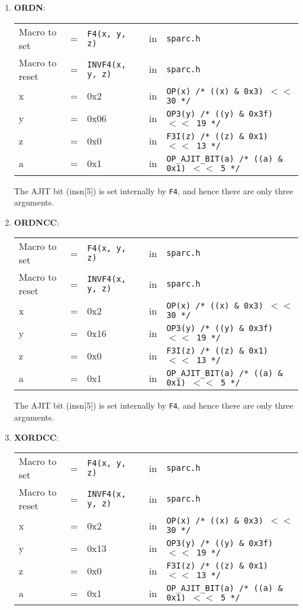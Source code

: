 \begin{itemize}
\begin{enumerate}
  \item \textbf{ORDN}:\\
    \begin{tabular}[h]{lclcl}
      Macro to set  &=& \texttt{F4(x, y, z)} &in& \texttt{sparc.h}     \\
      Macro to reset  &=& \texttt{INVF4(x, y, z)} &in& \texttt{sparc.h}     \\
      x &=& 0x2      &in& \texttt{OP(x)  /* ((x) \& 0x3)  $<<$ 30 */} \\
      y &=& 0x06     &in& \texttt{OP3(y) /* ((y) \& 0x3f) $<<$ 19 */} \\
      z &=& 0x0      &in& \texttt{F3I(z) /* ((z) \& 0x1)  $<<$ 13 */} \\
      a &=& 0x1      &in& \texttt{OP\_AJIT\_BIT(a) /* ((a) \& 0x1)  $<<$ 5 */}
    \end{tabular}

    The AJIT bit  (insn[5]) is set internally by  \texttt{F4}, and hence
    there are only three arguments.

  \item \textbf{ORDNCC}:\\
    \begin{tabular}[h]{lclcl}
      Macro to set  &=& \texttt{F4(x, y, z)} &in& \texttt{sparc.h}     \\
      Macro to reset  &=& \texttt{INVF4(x, y, z)} &in& \texttt{sparc.h}     \\
      x &=& 0x2      &in& \texttt{OP(x)  /* ((x) \& 0x3)  $<<$ 30 */} \\
      y &=& 0x16     &in& \texttt{OP3(y) /* ((y) \& 0x3f) $<<$ 19 */} \\
      z &=& 0x0      &in& \texttt{F3I(z) /* ((z) \& 0x1)  $<<$ 13 */} \\
      a &=& 0x1      &in& \texttt{OP\_AJIT\_BIT(a) /* ((a) \& 0x1)  $<<$ 5 */}
    \end{tabular}

    The AJIT bit  (insn[5]) is set internally by  \texttt{F4}, and hence
    there are only three arguments.

  \item \textbf{XORDCC}:\\
    \begin{tabular}[h]{lclcl}
      Macro to set  &=& \texttt{F4(x, y, z)} &in& \texttt{sparc.h}     \\
      Macro to reset  &=& \texttt{INVF4(x, y, z)} &in& \texttt{sparc.h}     \\
      x &=& 0x2      &in& \texttt{OP(x)  /* ((x) \& 0x3)  $<<$ 30 */} \\
      y &=& 0x13     &in& \texttt{OP3(y) /* ((y) \& 0x3f) $<<$ 19 */} \\
      z &=& 0x0      &in& \texttt{F3I(z) /* ((z) \& 0x1)  $<<$ 13 */} \\
      a &=& 0x1      &in& \texttt{OP\_AJIT\_BIT(a) /* ((a) \& 0x1)  $<<$ 5 */}
    \end{tabular}


\end{enumerate}
\end{itemize}
